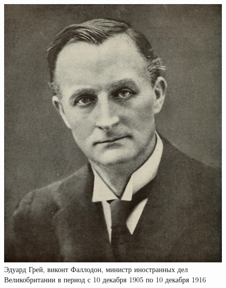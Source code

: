 \begin{figure}[h!tb] 
	\centering\includegraphics[scale=0.4]{Glava3/1v5GXqxlv_I.jpg}
	\caption{Эдуард Грей, виконт Фаллодон, министр иностранных дел Великобритании в период с 10 декабря 1905 по 10 декабря 1916}%
\end{figure}

